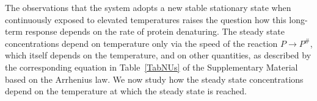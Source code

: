 \documentclass[oneside, 10pt, a4paper, twocolumn]{article}
\begin{document}
The observations that the system adopts a new stable stationary state when continuously exposed to elevated temperatures
raises the question how this long-term response depends on the rate of protein denaturing. 
The steady state concentrations depend on temperature only via the speed of the reaction $P \rightarrow P^\#$, which itself depends on the temperature, and on other quantities, as described by the corresponding equation in Table~\ref{TabNUs} of the Supplementary Material based on the Arrhenius law. We now study how the steady state concentrations depend on the temperature at which the steady state is reached.

\end{document}
